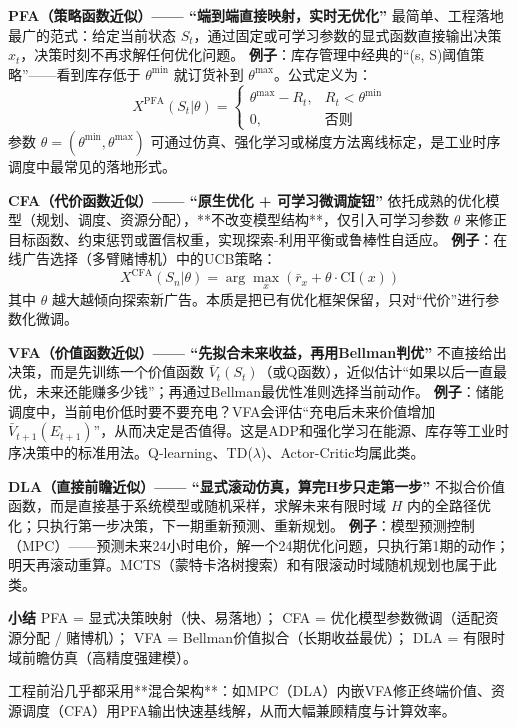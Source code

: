 \documentclass[11pt, a4paper]{article}
\begin{document}
\begin{tcolorbox}[scenariobox, title={四类策略的通俗理解}]
\textbf{PFA（策略函数近似）—— “端到端直接映射，实时无优化”}  
最简单、工程落地最广的范式：给定当前状态 $S_t$，通过固定或可学习参数的显式函数直接输出决策 $x_t$，决策时刻不再求解任何优化问题。  
\textbf{例子}：库存管理中经典的“(s, S)阈值策略”——看到库存低于 $\theta^{\min}$ 就订货补到 $\theta^{\max}$。公式定义为：
\[
X^{\text{PFA}}(S_t|\theta) = 
\begin{cases}
\theta^{\max} - R_t, & R_t < \theta^{\min} \\
0, & \text{否则}
\end{cases}
\]
参数 $\theta = (\theta^{\min},\theta^{\max})$ 可通过仿真、强化学习或梯度方法离线标定，是工业时序调度中最常见的落地形式。

\textbf{CFA（代价函数近似）—— “原生优化 + 可学习微调旋钮”}  
依托成熟的优化模型（规划、调度、资源分配），**不改变模型结构**，仅引入可学习参数 $\theta$ 来修正目标函数、约束惩罚或置信权重，实现探索-利用平衡或鲁棒性自适应。  
\textbf{例子}：在线广告选择（多臂赌博机）中的UCB策略：
\[
X^{\text{CFA}}(S_n|\theta) = \arg\max_x \left( \bar{r}_x + \theta \cdot \text{CI}(x) \right)
\]
其中 $\theta$ 越大越倾向探索新广告。本质是把已有优化框架保留，只对“代价”进行参数化微调。

\textbf{VFA（价值函数近似）—— “先拟合未来收益，再用Bellman判优”}  
不直接给出决策，而是先训练一个价值函数 $\bar{V}_t(S_t)$（或Q函数），近似估计“如果以后一直最优，未来还能赚多少钱”；再通过Bellman最优性准则选择当前动作。  
\textbf{例子}：储能调度中，当前电价低时要不要充电？VFA会评估“充电后未来价值增加 $\bar{V}_{t+1}(E_{t+1})$”，从而决定是否值得。这是ADP和强化学习在能源、库存等工业时序决策中的标准用法。Q-learning、TD($\lambda$)、Actor-Critic均属此类。

\textbf{DLA（直接前瞻近似）—— “显式滚动仿真，算完H步只走第一步”}  
不拟合价值函数，而是直接基于系统模型或随机采样，求解未来有限时域 $H$ 内的全路径优化；只执行第一步决策，下一期重新预测、重新规划。  
\textbf{例子}：模型预测控制（MPC）——预测未来24小时电价，解一个24期优化问题，只执行第1期的动作；明天再滚动重算。MCTS（蒙特卡洛树搜索）和有限滚动时域随机规划也属于此类。
\end{tcolorbox}

\noindent\textbf{小结}  
PFA = 显式决策映射（快、易落地）；  
CFA = 优化模型参数微调（适配资源分配 / 赌博机）；  
VFA = Bellman价值拟合（长期收益最优）；  
DLA = 有限时域前瞻仿真（高精度强建模）。  

工程前沿几乎都采用**混合架构**：如MPC（DLA）内嵌VFA修正终端价值、资源调度（CFA）用PFA输出快速基线解，从而大幅兼顾精度与计算效率。
\end{document}
